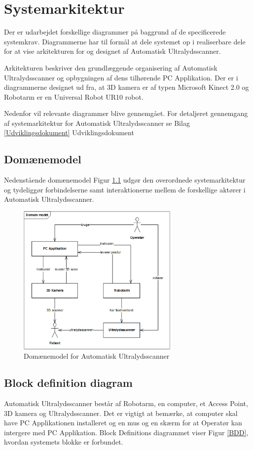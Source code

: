 \chapter{Systemarkitektur}\label{Systemarkitektur}
Der er udarbejdet forskellige diagrammer på baggrund af de specificerede systemkrav. Diagrammerne har til formål at dele systemet op i realiserbare dele for at vise arkitekturen for og designet af Automatisk Ultralydsscanner. 

Arkitekturen beskriver den grundlæggende organisering af Automatisk Ultralydsscanner og opbygningen af dens tilhørende PC Applikation. Der er i diagrammerne designet ud fra, at 3D kamera er af typen Microsoft Kinect 2.0 og Robotarm er en Universal Robot UR10 robot. 

Nedenfor vil relevante diagrammer blive gennemgået. For detaljeret gennemgang af systemarkitektur for Automatisk Ultralydsscanner se Bilag  \ref{Udviklingsdokument} Udviklingsdokument

\section{Domænemodel}
Nedenstående domænemodel Figur \ref{domain} udgør den overordnede systemarkitektur og tydeliggør forbindelserne samt interaktionerne mellem de forskellige aktører i Automatisk Ultralydsscanner. 

\begin{figure}[H]
    \centering
    \includegraphics[width=0.7\textwidth]{figurer/d/Design/uml_domain}
    \caption{Domænemodel for Automatisk Ultralydsscanner}
    \label{domain}
\end{figure}

\section{Block definition diagram}
Automatisk Ultralydsscanner består af Robotarm, en computer, et Access Point, 3D kamera og Ultralydsscanner. Det er vigtigt at bemærke, at computer skal have PC Applikationen installeret og en mus og en skærm for at Operatør kan intergere med PC Applikation. Block Definitions diagrammet viser Figur \ref{BDD}, hvordan systemets blokke er forbundet. 

